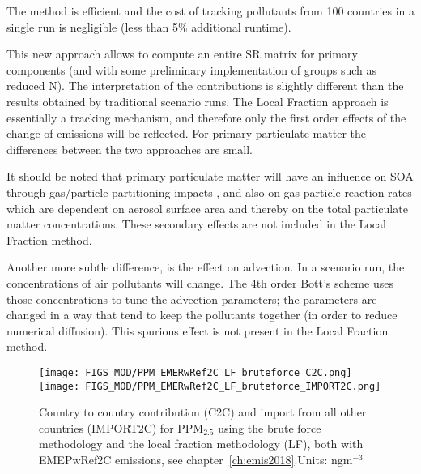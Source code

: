 The method is efficient and the cost of tracking pollutants from 100
countries in a single run is negligible (less than 5\% additional
runtime).

This new approach allows to compute an entire SR matrix
for primary components (and with some preliminary
implementation of groups such as reduced N). 
%
%
The interpretation of the contributions is slightly different than
the results obtained by traditional scenario runs. The Local Fraction
approach is essentially a tracking mechanism, and therefore only the first
order effects of the change of emissions will be reflected. For primary
particulate matter the differences between the two approaches are small.

It should be noted that primary particulate matter will have an influence
on SOA through gas/particle partitioning impacts \citep{Bergstrom2012},
and also on gas-particle reaction rates which are dependent on aerosol
surface area \citep{Stadtler2018} and thereby on the total particulate
matter concentrations. These secondary effects are not included in the
Local Fraction method.

Another more subtle difference, is the effect on advection. In a
scenario run, the concentrations of air pollutants will change. The
4th order Bott's scheme \citep{Bott1989a} uses those concentrations
to tune the advection parameters; the parameters are changed in a way
that tend to keep the pollutants together (in order to reduce numerical
diffusion). This spurious effect is not present in the Local Fraction
method.


\begin{figure}%
\centering
\texttt{[image: FIGS\_MOD/PPM\_EMERwRef2C\_LF\_bruteforce\_C2C.png]}\\
\texttt{[image: FIGS\_MOD/PPM\_EMERwRef2C\_LF\_bruteforce\_IMPORT2C.png]}\\

\caption{Country to country contribution (C2C) and import from all other countries (IMPORT2C) for PPM$_{2.5}$ using the brute force methodology and the local fraction methodology (LF), both with EMEPwRef2C emissions, see chapter~\ref{ch:emis2018}.Units: ngm$^{-3}$
\label{fig:LF_SR}
}
\end{figure}

